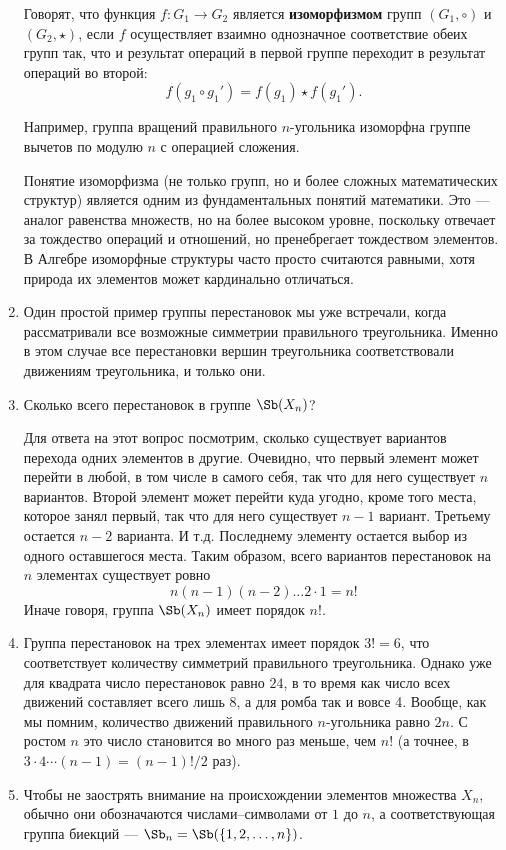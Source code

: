 \begin{enumerate}
Говорят, что функция $f:G_1\to G_2$ является \textbf{изоморфизмом} групп $(G_1,\circ)$ и $(G_2,\star)$, если $f$ осуществляет взаимно однозначное соответствие обеих групп так, что и результат операций в первой группе переходит в результат операций во второй:
$$
f(g_1\circ g_1') = f(g_1)\star f(g_1').
$$

Например, группа вращений правильного $n$-угольника изоморфна группе вычетов по модулю $n$ с операцией сложения.

Понятие изоморфизма (не только групп, но и более сложных математических структур) является одним из фундаментальных понятий математики. Это --- аналог равенства множеств, но на более высоком уровне, поскольку отвечает за тождество операций и отношений, но пренебрегает тождеством элементов. В Алгебре изоморфные структуры часто просто считаются равными, хотя природа их элементов может кардинально отличаться.

\item Один простой пример группы перестановок мы уже встречали, когда рассматривали все возможные симметрии правильного треугольника. Именно в этом случае все перестановки вершин треугольника соответствовали движениям треугольника, и только они.
\item Сколько всего перестановок в группе $\Sb(X_n)$?

Для ответа на этот вопрос посмотрим, сколько существует вариантов перехода одних элементов в другие. Очевидно, что первый элемент может перейти в любой, в том числе в самого себя, так что для него существует $n$ вариантов. Второй элемент может перейти куда угодно, кроме того места, которое занял первый, так что для него существует $n-1$ вариант. Третьему остается $n-2$ варианта. И т.д. Последнему элементу остается выбор из одного оставшегося места. Таким образом, всего вариантов перестановок на $n$ элементах существует ровно
$$
n(n-1)(n-2)\dots 2\cdot 1=n!
$$
Иначе говоря, группа $\Sb(X_n)$ имеет порядок $n!$.

\item Группа перестановок на трех элементах имеет порядок $3!=6$, что соответствует количеству симметрий правильного треугольника.
Однако уже для квадрата число перестановок равно $24$, в то время как число всех движений составляет всего лишь 8, а для ромба так и вовсе 4. Вообще, как мы помним, количество движений правильного $n$-угольника равно $2n$. С ростом $n$ это число становится во много раз меньше, чем $n!$ (а точнее, в $3\cdot 4\cdots (n-1)=(n-1)!/2$ раз).
\item Чтобы не заострять внимание на происхождении элементов множества $X_n$, обычно они обозначаются числами--символами от $1$ до $n$, а соответствующая группа биекций --- $\Sb_n=\Sb(\{1,2,\dots,n\})$. 


\end{enumerate}
